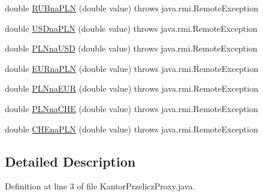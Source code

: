 \begin{DoxyCompactItemize}
\item 
double \hyperlink{classkantor_1_1com_1_1web_1_1service_1_1_kantor_przelicz_proxy_a7c1eb7f1917e3f6f69b5d4c20f18a764}{R\+U\+Bna\+P\+L\+N} (double value)  throws java.\+rmi.\+Remote\+Exception
\item 
double \hyperlink{classkantor_1_1com_1_1web_1_1service_1_1_kantor_przelicz_proxy_ad6db21ad3720cdfaf5d27db59412c630}{U\+S\+Dna\+P\+L\+N} (double value)  throws java.\+rmi.\+Remote\+Exception
\item 
double \hyperlink{classkantor_1_1com_1_1web_1_1service_1_1_kantor_przelicz_proxy_a18431c0ee3b7a7765911cf055ff10cea}{P\+L\+Nna\+U\+S\+D} (double value)  throws java.\+rmi.\+Remote\+Exception
\item 
double \hyperlink{classkantor_1_1com_1_1web_1_1service_1_1_kantor_przelicz_proxy_afcaaed0493d9da86ff7eb4d6fb3a7e6d}{E\+U\+Rna\+P\+L\+N} (double value)  throws java.\+rmi.\+Remote\+Exception
\item 
double \hyperlink{classkantor_1_1com_1_1web_1_1service_1_1_kantor_przelicz_proxy_a4ee32718c9f24b212f904e46fbb734bf}{P\+L\+Nna\+E\+U\+R} (double value)  throws java.\+rmi.\+Remote\+Exception
\item 
double \hyperlink{classkantor_1_1com_1_1web_1_1service_1_1_kantor_przelicz_proxy_a2034d7a78dc86c2fbeb9c104c5ff04f1}{P\+L\+Nna\+C\+H\+E} (double value)  throws java.\+rmi.\+Remote\+Exception
\item 
double \hyperlink{classkantor_1_1com_1_1web_1_1service_1_1_kantor_przelicz_proxy_a3e40e9d8fb68c3edc8d0301b2fe524b6}{C\+H\+Ena\+P\+L\+N} (double value)  throws java.\+rmi.\+Remote\+Exception
\end{DoxyCompactItemize}


\subsection{Detailed Description}


Definition at line 3 of file Kantor\+Przelicz\+Proxy.\+java.



